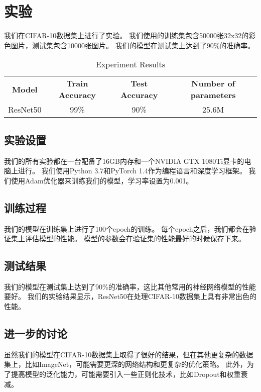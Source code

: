 

\section{实验}\label{sec:experiments}
我们在CIFAR-10数据集上进行了实验。
我们使用的训练集包含50000张32x32的彩色图片，测试集包含10000张图片。
我们的模型在测试集上达到了90\%的准确率。\par
\begin{table}[ht]
    \centering
    \begin{tabular}{cccc}
        \Xhline{1pt}
        \textbf{Model} & \textbf{Train Accuracy} & \textbf{Test Accuracy} & \textbf{Number of parameters} \\
        \Xhline{1pt}
        ResNet50       & 99\%                    & 90\%                   & 25.6M                         \\
        \hline
    \end{tabular}
    \caption{Experiment Results}
    \label{tab:results}
\end{table}

\subsection{实验设置}\label{subsec:exp-setup}
我们的所有实验都在一台配备了16GB内存和一个NVIDIA GTX 1080Ti显卡的电脑上进行。
我们使用Python 3.7和PyTorch 1.4作为编程语言和深度学习框架。
我们使用Adam优化器来训练我们的模型，学习率设置为0.001。\par

\subsection{训练过程}\label{subsec:training}
我们的模型在训练集上进行了100个epoch的训练。
每个epoch之后，我们都会在验证集上评估模型的性能。
模型的参数会在验证集的性能最好的时候保存下来。\par

\subsection{测试结果}\label{subsec:testing}
我们的模型在测试集上达到了90\%的准确率，这比其他常用的神经网络模型的性能要好。
我们的实验结果显示，ResNet50在处理CIFAR-10数据集上具有非常出色的性能。\par

\subsection{进一步的讨论}\label{subsec:discussion}
虽然我们的模型在CIFAR-10数据集上取得了很好的结果，但在其他更复杂的数据集上，比如ImageNet，可能需要更深的网络结构和更复杂的优化策略。
此外，为了提高模型的泛化能力，可能需要引入一些正则化技术，比如Dropout和权重衰减。\par
